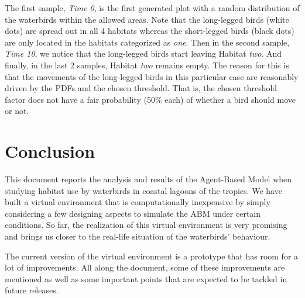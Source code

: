 The first sample, \emph{Time 0}, is the first generated plot with a random distribution of the waterbirds within the allowed areas. Note that the long-legged birds (white dots) are spread out in all 4 habitats whereas the short-legged birds (black dots) are only located in the habitats categorized as \emph{one}. Then in the second sample, \emph{Time 10}, we notice that the long-legged birds start leaving Habitat \emph{two}. And finally, in the last 2 samples, Habitat \emph{two} remains empty. The reason for this is that the movements of the long-legged birds in this particular case are reasonably driven by the PDFs and the chosen threshold. That is, the chosen threshold factor does not have a fair probability (50\% each) of whether a bird should move or not.

\section{Conclusion}
This document reports the analysis and results of the Agent-Based Model when studying habitat use by waterbirds in coastal lagoons of the tropics. We have built a virtual environment that is computationally inexpensive by simply considering a few designing aspects to simulate the ABM under certain conditions. So far, the realization of this virtual environment is very promising and brings us closer to the real-life situation of the waterbirds' behaviour.

The current version of the virtual environment is a prototype that has room for a lot of improvements. All along the document, some of these improvements are mentioned as well as some important points that are expected to be tackled in future releases.

